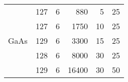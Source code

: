\begin{table}[htbp]
\begin{center}
\begin{tabular}	{p{1.5cm}ccrrr}
            \hline
                        & 127                          & 6             & 880            & 5                & 25                               \\
                        & 127                          & 6             & 1750           & 10               & 25                               \\
            GaAs        & 129                          & 6             & 3300           & 15               & 25                               \\
                        & 128                          & 6             & 8000           & 30               & 25                               \\
                        & 129                          & 6             & 16400          & 30               & 50                               \\
            \hline
        \end{tabular}
    \end{center}
\end{table}
